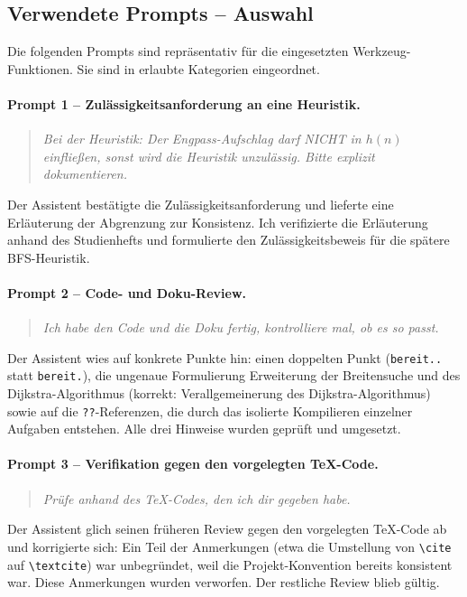\subsection{Verwendete Prompts -- Auswahl}

Die folgenden Prompts sind repräsentativ für die eingesetzten Werkzeug-Funktionen. Sie sind in erlaubte Kategorien eingeordnet.

\paragraph{Prompt 1 -- Zulässigkeitsanforderung an eine Heuristik.}
\begin{quote}
\textit{\glqq{}Bei der Heuristik: Der Engpass-Aufschlag darf NICHT in \(h(n)\) einfließen, sonst wird die Heuristik unzulässig. Bitte explizit dokumentieren.\grqq{}}
\end{quote}
Der Assistent bestätigte die Zulässigkeitsanforderung und lieferte eine Erläuterung der Abgrenzung zur Konsistenz. Ich verifizierte die Erläuterung anhand des Studienhefts \textcite[S. 21\,f.]{5} und formulierte den Zulässigkeitsbeweis für die spätere \acs{BFS}-Heuristik.

\paragraph{Prompt 2 -- Code- und Doku-Review.}
\begin{quote}
\textit{\glqq{}Ich habe den Code und die Doku fertig, kontrolliere mal, ob es so passt.\grqq{}}
\end{quote}
Der Assistent wies auf konkrete Punkte hin: einen doppelten Punkt (\texttt{bereit..} statt \texttt{bereit.}), die ungenaue Formulierung \glqq{}Erweiterung der Breitensuche und des Dijkstra-Algorithmus\grqq{} (korrekt: \glqq{}Verallgemeinerung des Dijkstra-Algorithmus\grqq{}) sowie auf die \texttt{??}-Referenzen, die durch das isolierte Kompilieren einzelner Aufgaben entstehen. Alle drei Hinweise wurden geprüft und umgesetzt.

\paragraph{Prompt 3 -- Verifikation gegen den vorgelegten \TeX-Code.}
\begin{quote}
\textit{\glqq{}Prüfe anhand des \TeX-Codes, den ich dir gegeben habe.\grqq{}}
\end{quote}
Der Assistent glich seinen früheren Review gegen den vorgelegten \TeX-Code ab und korrigierte sich: Ein Teil der Anmerkungen (etwa die Umstellung von \texttt{\textbackslash cite} auf \texttt{\textbackslash textcite}) war unbegründet, weil die Projekt-Konvention bereits konsistent war. Diese Anmerkungen wurden verworfen. Der restliche Review blieb gültig.

